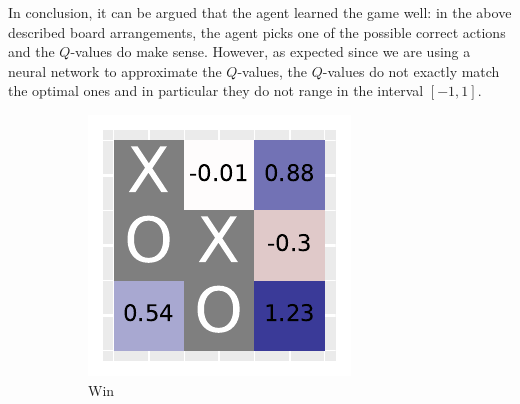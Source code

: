 \documentclass[10pt]{IEEEtran}
\begin{document}
In conclusion, it can be argued that the agent learned the game well: in the above described board arrangements, the agent picks one of the possible correct actions and the $Q$-values do make sense. However, as expected since we are using a neural network to approximate the $Q$-values, the $Q$-values do not exactly match the optimal ones and in particular they do not range in the interval $[-1,1]$.

\begin{figure}[h]
     \centering
     \begin{subfigure}[t]{0.32\linewidth}
         \centering
         \includegraphics[width=\linewidth]{code/figures/deep_heatmap_0.pdf}
         \caption{Win}
         \label{fig_deep_heatmap_1}
     \end{subfigure}
     \hfill
     \begin{subfigure}[t]{0.32\linewidth}
         \centering

\end{subfigure}
\end{figure}
\end{document}
